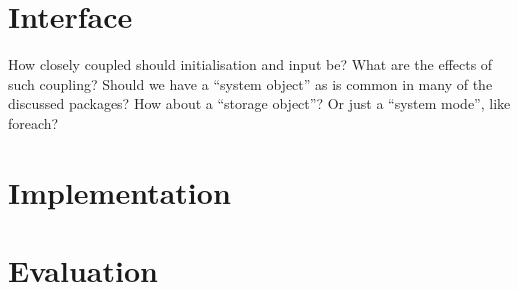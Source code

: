 \documentclass[a4paper,10pt]{article}
\begin{document}

\section{Interface}
How closely coupled should initialisation and input be? What are the effects of such coupling?
Should we have a ``system object'' as is common in many of the discussed packages?
How about a ``storage object''?
Or just a ``system mode'', like foreach?

\section{Implementation}

\section{Evaluation}

\printbibliography
\end{document}
